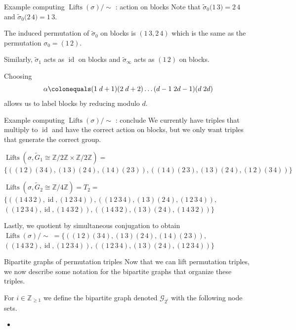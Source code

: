 \documentclass[xcolor=dvipsnames]{beamer}
\theoremstyle{plain}
\newcommand{\ZZ}{\mathbb Z}
\newcommand{\wt}[1]{\widetilde{#1}}
\DeclareMathOperator{\Lifts}{Lifts}
\DeclareMathOperator{\id}{id}
\begin{document}
{\begin{frame}{Example computing $\Lifts(\sigma)/\!\!\sim$ : action on blocks}
      Note that
      $\wt{\sigma}_0\Big(\boxed{1\,3}\Big) = \boxed{2\,4}$
      and
      $\wt{\sigma}_0\Big(\boxed{2\,4}\Big) = \boxed{1\,3}$.
      \pause\par
      The induced permutation
      of $\wt{\sigma}_0$ on blocks is
      $\left(\boxed{1\,3},\boxed{2\,4}\right)$
      which is the same as the
      permutation $\sigma_0 = (1\,2)$.
      \pause\par
      Similarly,
      $\wt{\sigma}_1$ acts as $\id$ on blocks
      and $\wt{\sigma}_\infty$ acts
      as $(1\,2)$ on blocks.
      \pause\par
      Choosing
      \[
        \alpha\colonequals
        (1\;d+1)(2\;d+2)\dots
        (d-1\;2d-1)(d\;2d)
      \]
      allows us to label blocks by reducing modulo $d$.
    \end{frame}
    \begin{frame}{Example computing $\Lifts(\sigma)/\!\!\sim$ : conclude}
      We currently have triples that multiply to $\id$
      and have the correct action on blocks,
      but we only want triples that
      generate the correct group.
      \pause\par
      $\Lifts(\sigma,\wt{G}_1\cong\ZZ/2\ZZ\times\ZZ/2\ZZ)=$
      $\Big\{ ((1\,2)(3\,4), (1\,3)(2\,4), (1\,4)(2\,3)),
      ((1\,4)(2\,3), (1\,3)(2\,4), (1\,2)(3\,4)) \Big\}$
      \pause\par
      $\Lifts(\sigma,\wt{G}_2\cong\ZZ/4\ZZ)=T_2=$
      $\Big\{ ((1\,4\,3\,2), \id, (1\,2\,3\,4)),
      ((1\,2\,3\,4), (1\,3)(2\,4), (1\,2\,3\,4)),$
      $((1\,2\,3\,4), \id, (1\,4\,3\,2)),
      ((1\,4\,3\,2), (1\,3)(2\,4), (1\,4\,3\,2)) \Big\}$
      \pause\par
      Lastly, we quotient by simultaneous conjugation to obtain
      $\Lifts(\sigma)/\!\!\sim \;=\Big\{
      ((1\,2)(3\,4),(1\,3)(2\,4),(1\,4)(2\,3)),$
      $((1\,4\,3\,2),\id,(1\,2\,3\,4)),
      ((1\,2\,3\,4),(1\,3)(2\,4),(1\,2\,3\,4)) \Big\}$
    \end{frame}
    \begin{frame}{Bipartite graphs of permutation triples}
      Now that we can lift permutation triples,
      we now describe some notation for the bipartite
      graphs that organize these triples.
      \pause\par
      For $i\in\ZZ_{\geq 1}$ we define the bipartite
      graph denoted $\mathscr{G}_{2^i}$ with the following
      node sets.
      \begin{itemize}
        \item

\end{itemize}
\end{frame}}
\end{document}
